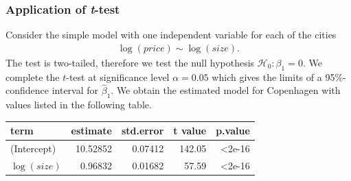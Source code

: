 \subsubsection{Application of \textit{t}-test}  \label{ex:ttest}
Consider the simple model with one independent variable for each of the cities 
\begin{align*}
    \log(price) \sim \log(size).
\end{align*}
The test is two-tailed, therefore we test the null hypothesis $\mathcal{H}_0:\beta_1=0.$
We complete the $t$-test at significance level $\alpha=0.05$ which gives the limits of a 95\%-confidence interval for $\hat{\beta}_1$.
We obtain the estimated model for Copenhagen with values listed in the following table.

\begin{table}[H]
\centering
\begin{tabular}{lrrrr}
\toprule
\textbf{term} & \textbf{estimate} & \textbf{std.error} & \textbf{t value} & \textbf{p.value}\\
\midrule
(Intercept) & 10.52852 & 0.07412 & 142.05 & <2e-16\\
$\log(size)$ & 0.96832 & 0.01682 & 57.59 & <2e-16\\
\bottomrule
\end{tabular}
\end{table}

